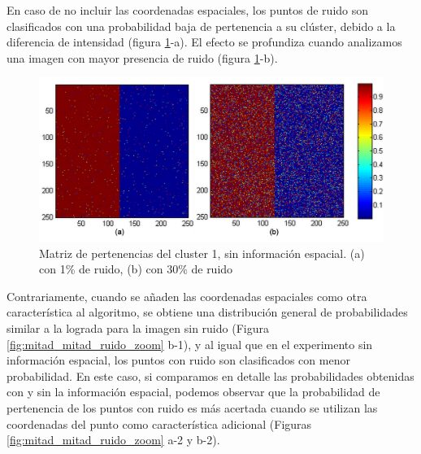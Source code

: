 En caso de no incluir las coordenadas espaciales, los puntos de ruido son clasificados con una probabilidad baja de pertenencia a su clúster, debido a la diferencia de intensidad (figura \ref{fig:ruido_1y30}-a). El efecto se profundiza cuando analizamos una imagen con mayor presencia de ruido (figura \ref{fig:ruido_1y30}-b).


\begin{figure}[H]
\centering
\includegraphics[scale=0.055]{images/mitad_mitad__ruido_1y_30.jpg}
\caption{Matriz de pertenencias del cluster 1, sin información espacial. (a) con 1\% de ruido, (b) con 30\% de ruido
}
\label{fig:ruido_1y30}
\end{figure}

Contrariamente, cuando se añaden las coordenadas espaciales como otra característica al algoritmo, se obtiene una distribución general de probabilidades similar a la lograda para la imagen sin ruido (Figura \ref{fig:mitad_mitad_ruido_zoom} b-1), y al igual que en el experimento sin información espacial, los puntos con ruido son clasificados con menor probabilidad. 
En este caso, si comparamos en detalle las probabilidades obtenidas con y sin la información espacial, podemos observar que la probabilidad de pertenencia de los  puntos con ruido es más acertada cuando se utilizan las coordenadas del punto como característica adicional (Figuras \ref{fig:mitad_mitad_ruido_zoom} a-2 y b-2).


